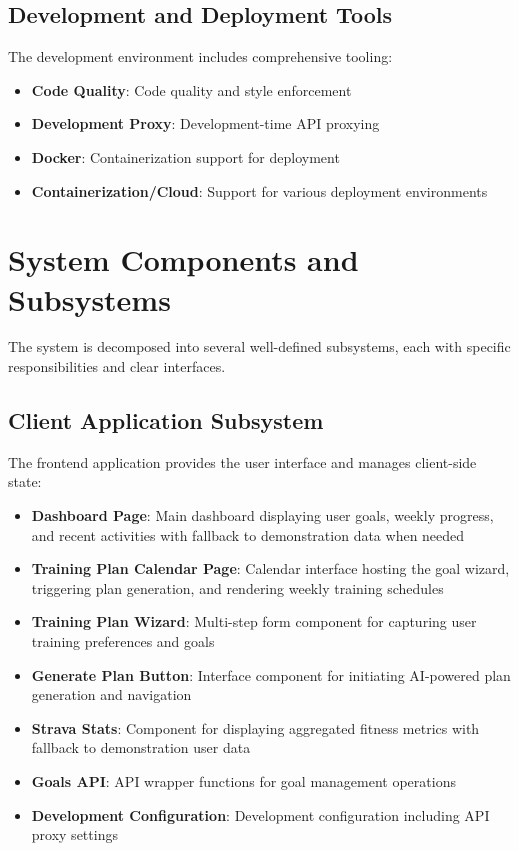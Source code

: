 \subsection{Development and Deployment Tools}

The development environment includes comprehensive tooling:

\begin{itemize}
    \item \textbf{Code Quality}: Code quality and style enforcement
    \item \textbf{Development Proxy}: Development-time API proxying
    \item \textbf{Docker}: Containerization support for deployment
    \item \textbf{Containerization/Cloud}: Support for various deployment environments
\end{itemize}

\section{System Components and Subsystems}

The system is decomposed into several well-defined subsystems, each with specific responsibilities and clear interfaces.

\subsection{Client Application Subsystem}

The frontend application provides the user interface and manages client-side state:

\begin{itemize}
    \item \textbf{Dashboard Page}: Main dashboard displaying user goals, weekly progress, and recent activities with fallback to demonstration data when needed
    \item \textbf{Training Plan Calendar Page}: Calendar interface hosting the goal wizard, triggering plan generation, and rendering weekly training schedules
    \item \textbf{Training Plan Wizard}: Multi-step form component for capturing user training preferences and goals
    \item \textbf{Generate Plan Button}: Interface component for initiating AI-powered plan generation and navigation
    \item \textbf{Strava Stats}: Component for displaying aggregated fitness metrics with fallback to demonstration user data
    \item \textbf{Goals API}: API wrapper functions for goal management operations
    \item \textbf{Development Configuration}: Development configuration including API proxy settings
\end{itemize}

